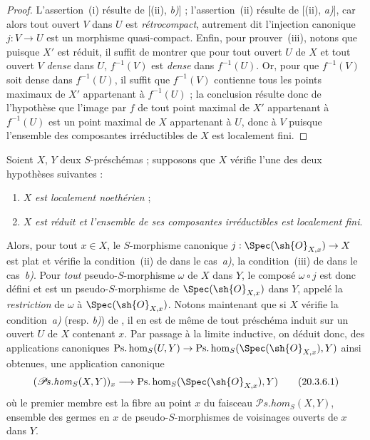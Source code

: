\begin{proof}
L'assertion~(i) résulte de [(ii), \emph{b)}] ; l'assertion~(ii) résulte de [(ii), \emph{a)}], car alors tout ouvert $V$ dans $U$ est \emph{rétrocompact}, autrement dit l'injection canonique $j:V\to U$ est un morphisme quasi-compact.
Enfin, pour prouver~(iii), notons que puisque $X'$ est réduit, il suffit de montrer que pour tout ouvert $U$ de $X$ et tout ouvert $V$ \emph{dense} dans $U$, $f^{-1}(V)$ est \emph{dense} dans $f^{-1}(U)$.
Or, pour que $f^{-1}(V)$ soit dense dans $f^{-1}(U)$, il suffit que $f^{-1}(V)$ contienne tous les points maximaux de $X'$ appartenant à $f^{-1}(U)$ ; la conclusion résulte donc de l'hypothèse que l'image par $f$ de tout point
maximal de $X'$ appartenant à $f^{-1}(U)$ est un point maximal de $X$ appartenant à $U$, donc à $V$ puisque l'ensemble des composantes irréductibles de $X$ est localement fini.
\end{proof}

\begin{env}[20.3.6]
Soient $X$, $Y$ deux $S$-préschémas ; supposons que $X$ vérifie l'une des deux hypothèses suivantes :
\begin{enumerate}[label=\alph*)]
  \item $X$ \emph{est localement noethérien} ;
  \item $X$ \emph{est réduit et l'ensemble de ses composantes irréductibles est localement fini}.
\end{enumerate}

Alors, pour tout $x\in X$, le $S$-morphisme canonique $j:\Spec(\sh{O}_{X,x})\to X$ est plat et vérifie la condition~(ii) de  dans le cas~\emph{a)}, la condition~(iii) de  dans le cas~\emph{b)}.
Pour \emph{tout} pseudo-$S$-morphisme $\omega$ de $X$ dans $Y$, le composé $\omega\circ j$ est donc défini et est un pseudo-$S$-morphisme de $\Spec(\sh{O}_{X,x})$ dans $Y$, appelé la \emph{restriction} de $\omega$ à $\Spec(\sh{O}_{X,x})$.
Notons maintenant que si $X$ vérifie la condition~\emph{a)} (resp. \emph{b)}) de , il en est de même de tout préschéma induit sur un ouvert $U$ de $X$ contenant $x$.
Par passage à la limite inductive, on déduit donc, des applications canoniques $\operatorname{Ps.hom}_S(U,Y)\to\operatorname{Ps.hom}_S(\Spec(\sh{O}_{X,x}),Y)$ ainsi obtenues, une application canonique
\[
\label{IV.20.3.6.1}
  (\mathscr{P}\!s.\mathit{hom}_S(X,Y))_x\to\operatorname{Ps.hom}_S(\Spec(\sh{O}_{X,x}),Y)
  \tag{20.3.6.1}
\]
où le premier membre est la fibre au point $x$ du faisceau $\mathscr{P}\!s.\mathit{hom}_S(X,Y)$, ensemble des germes en $x$ de pseudo-$S$-morphismes de voisinages ouverts de $x$ dans $Y$.
\end{env}

